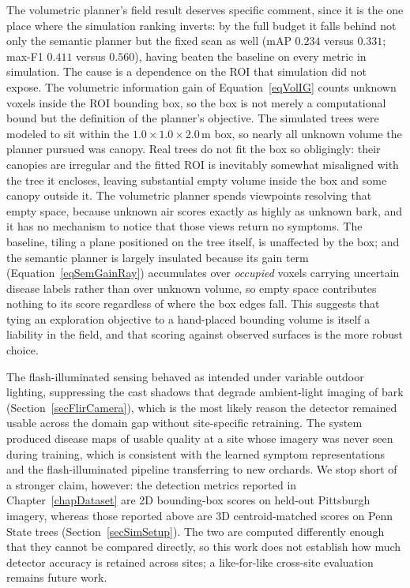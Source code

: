 The volumetric planner's field result deserves specific comment, since it is
the one place where the simulation ranking inverts: by the full budget it
falls behind not only the semantic planner but the fixed scan as well
(mAP $0.234$ versus $0.331$; max-F1 $0.411$ versus $0.560$), having beaten
the baseline on every metric in simulation. The cause is a dependence on the
ROI that simulation did not expose. The volumetric information gain of
Equation~\ref{eqVolIG} counts unknown voxels inside the ROI bounding box, so
the box is not merely a computational bound but the definition of the
planner's objective. The simulated trees were modeled to sit within the
$1.0 \times 1.0 \times 2.0$\,m box, so nearly all unknown volume the planner
pursued was canopy. Real trees do not fit the box so obligingly: their
canopies are irregular and the fitted ROI is inevitably somewhat misaligned
with the tree it encloses, leaving substantial empty volume inside the box
and some canopy outside it. The volumetric planner spends viewpoints
resolving that empty space, because unknown air scores exactly as highly as
unknown bark, and it has no mechanism to notice that those views return no
symptoms. The baseline, tiling a plane positioned on the tree itself, is
unaffected by the box; and the semantic planner is largely insulated because
its gain term (Equation~\ref{eqSemGainRay}) accumulates over \emph{occupied}
voxels carrying uncertain disease labels rather than over unknown volume, so
empty space contributes nothing to its score regardless of where the box
edges fall. This suggests that tying an exploration objective to a
hand-placed bounding volume is itself a liability in the field, and that
scoring against observed surfaces is the more robust choice.

The flash-illuminated sensing behaved as
intended under variable outdoor lighting, suppressing the cast shadows
that degrade ambient-light imaging of bark (Section~\ref{secFlirCamera}),
which is the most likely reason the detector remained usable across the
domain gap without site-specific retraining.
The system produced disease maps of usable quality at a site whose imagery
was never seen during training, which is consistent with the learned symptom
representations and the flash-illuminated pipeline transferring to new
orchards.
We stop short of a stronger claim, however: the detection metrics reported in
Chapter~\ref{chapDataset} are 2D bounding-box scores on held-out Pittsburgh
imagery, whereas those reported above are 3D centroid-matched scores on Penn
State trees (Section~\ref{secSimSetup}).
The two are computed differently enough that they cannot be compared directly,
so this work does not establish how much detector accuracy is retained across
sites; a like-for-like cross-site evaluation remains future work.

